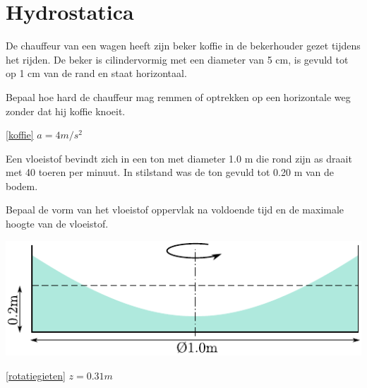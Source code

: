 \chapter{Hydrostatica}
\label{sec:Hydrostatica}
\begin{toepassing}
	\label{koffie}
De chauffeur van een wagen heeft zijn beker koffie in de bekerhouder gezet tijdens het rijden. De beker is cilindervormig met een diameter van 5 cm, is gevuld tot op 1 cm van de rand en staat horizontaal.
		
Bepaal hoe hard de chauffeur mag remmen of optrekken op een horizontale weg zonder dat hij koffie knoeit.
\end{toepassing}
\begin{antwoord}{\ref{koffie}}
	$a = 4 \unit{m/s^2}$
\end{antwoord}
\begin{toepassing}
	\label{rotatiegieten}
Een vloeistof bevindt zich in een ton met diameter 1.0 m die rond zijn as draait met 40 toeren per minuut. In stilstand was de ton gevuld tot 0.20 m van de bodem. 
		
Bepaal de vorm van het vloeistof oppervlak na voldoende tijd en de maximale hoogte van de vloeistof.

	\centering
	\includegraphics{fig/hydrostatica/rotatiegieten}
\end{toepassing}
\begin{antwoord}{\ref{rotatiegieten}}
	$z = 0.31 \unit{m}$ 
\end{antwoord}
